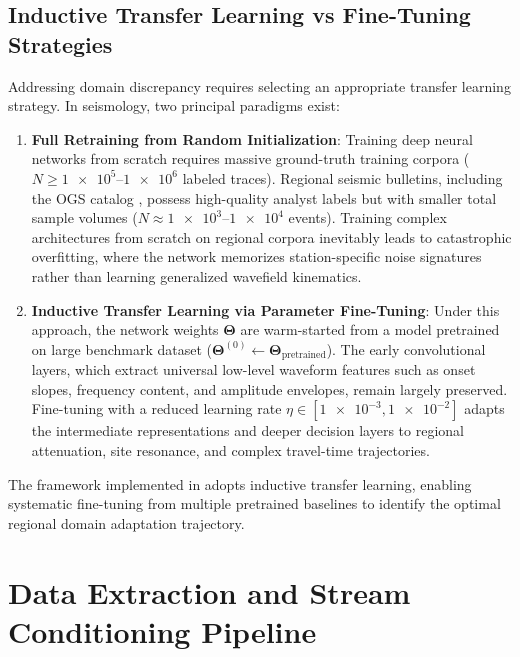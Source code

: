 \subsection{Inductive Transfer Learning vs Fine-Tuning Strategies}
\label{subsec:transfer_strategies}

Addressing domain discrepancy requires selecting an appropriate
transfer learning
strategy. In seismology, two principal paradigms exist:
\begin{enumerate}
  \item \textbf{Full Retraining from Random Initialization}: Training deep
    neural networks from scratch requires massive ground-truth training corpora
    ($N \ge \numrange{1e5}{1e6}$ labeled traces). Regional seismic bulletins,
    including the \ac{OGS} catalog \parencite{MagrinEtAl2026RevisedOGSCatalog},
    possess high-quality analyst labels but with smaller total sample volumes
    ($N \approx \numrange{1e3}{1e4}$ events). Training complex
    architectures from
    scratch on regional corpora inevitably leads to catastrophic overfitting,
    where the network memorizes station-specific noise signatures rather than
    learning generalized wavefield kinematics.
  \item \textbf{Inductive Transfer Learning via Parameter Fine-Tuning}:
    Under this approach, the network weights $\bm{\Theta}$ are warm-started
    from a model pretrained on large benchmark dataset
    ($\bm{\Theta}^{(0)} \leftarrow \bm{\Theta}_{\mathrm{pretrained}}$).
    The early convolutional layers, which extract universal low-level waveform
    features such as onset slopes, frequency content, and amplitude envelopes,
    remain largely preserved. Fine-tuning with a reduced learning rate
    $\eta \in [\num{1e-3}, \num{1e-2}]$ adapts the intermediate
    representations and
    deeper decision layers to regional attenuation, site resonance, and complex
    travel-time trajectories.
\end{enumerate}

The framework implemented in  adopts inductive
transfer learning, enabling systematic fine-tuning from multiple pretrained
baselines to identify the optimal regional domain adaptation trajectory.

\section{Data Extraction and Stream Conditioning Pipeline}
\label{sec:data_extraction_pipeline}

